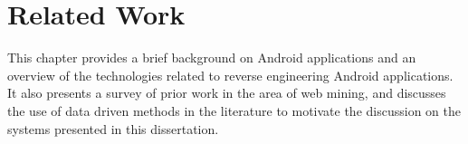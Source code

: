 \chapter{Related Work}
\label{ch:related_work_chapter}
This chapter provides a brief background on Android applications and an overview of the technologies related to reverse engineering Android applications.
It also presents a survey of prior work in the area of web mining, and discusses the use of data driven methods in the literature to motivate the discussion on the systems presented in this dissertation.










